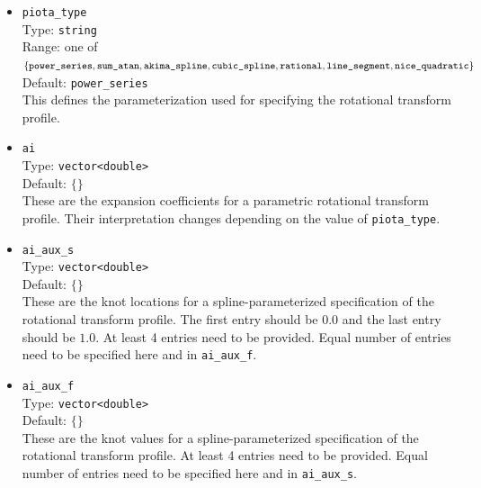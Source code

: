 \begin{itemize}

 \item \texttt{piota\_type} \\
       Type: \texttt{string} \\
       Range: one of $\{ \texttt{power\_series},
                         \texttt{sum\_atan},
                         \texttt{akima\_spline},
                         \texttt{cubic\_spline}, \\
                         \texttt{rational},
                         \texttt{line\_segment},
                         \texttt{nice\_quadratic} \}$ \\
       Default: \texttt{power\_series} \\
       This defines the parameterization used for specifying the rotational transform profile.

 \item \texttt{ai} \\
       Type: \texttt{vector<double>} \\
       Default: $\{ \}$ \\
       These are the expansion coefficients for a parametric rotational transform profile.
       Their interpretation changes depending on the value of \texttt{piota\_type}.

 \item \texttt{ai\_aux\_s} \\
       Type: \texttt{vector<double>} \\
       Default: $\{ \}$ \\
       These are the knot locations for a spline-parameterized specification
       of the rotational transform profile.
       The first entry should be $0.0$ and the last entry should be $1.0$.
       At least 4 entries need to be provided.
       Equal number of entries need to be specified here and in \texttt{ai\_aux\_f}.

 \item \texttt{ai\_aux\_f} \\
       Type: \texttt{vector<double>} \\
       Default: $\{ \}$ \\
       These are the knot values for a spline-parameterized specification
       of the rotational transform profile.
       At least 4 entries need to be provided.
       Equal number of entries need to be specified here and in \texttt{ai\_aux\_s}.

\end{itemize}

